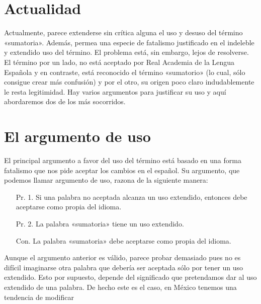 \documentclass[draft,letter,10pt,notitlepage]{article}
\theoremstyle{definition}
\theoremstyle{remark}
\begin{document}
\section{Actualidad}
Actualmente, parece extenderse sin crítica alguna el uso y desuso del
término «sumatoria». Además, permea una especie de fatalismo justificado
en el indeleble y extendido uso del término. El problema está,
sin embargo, lejos de resolverse. El término por un lado, no está
aceptado por Real Academia de la Lengua Española y en contraste,
está reconocido el término «sumatorio» (lo cual, sólo consigue crear
más confusión) y por el otro, su origen poco claro indudablemente le
resta legitimidad. Hay varios argumentos para justificar su uso y aquí
abordaremos dos de los más socorridos.

\section{El argumento de uso}
El principal argumento a favor del uso del término está basado en
una forma fatalismo que nos pide aceptar los cambios en el español. Su
argumento, que podemos llamar argumento de uso, razona de la siguiente
manera:

\begin{itemize}
\item[Pr. 1.] Si una palabra no aceptada alcanza un uso extendido,
  entonces debe aceptarse como propia del idioma.
\item[Pr. 2.] La palabra «sumatoria» tiene un uso extendido.
\item[Con.] La palabra «sumatoria» debe aceptarse como propia del idioma.
\end{itemize}

Aunque el argumento anterior es válido, parece probar demasiado pues
no es difícil imaginarse otra palabra que debería ser aceptada sólo
por tener un uso extendido. Esto por supuesto, depende del significado
que pretendamos dar al uso extendido de una palabra. De hecho este es
el caso, en México tenemos una tendencia de modificar
\end{document}
